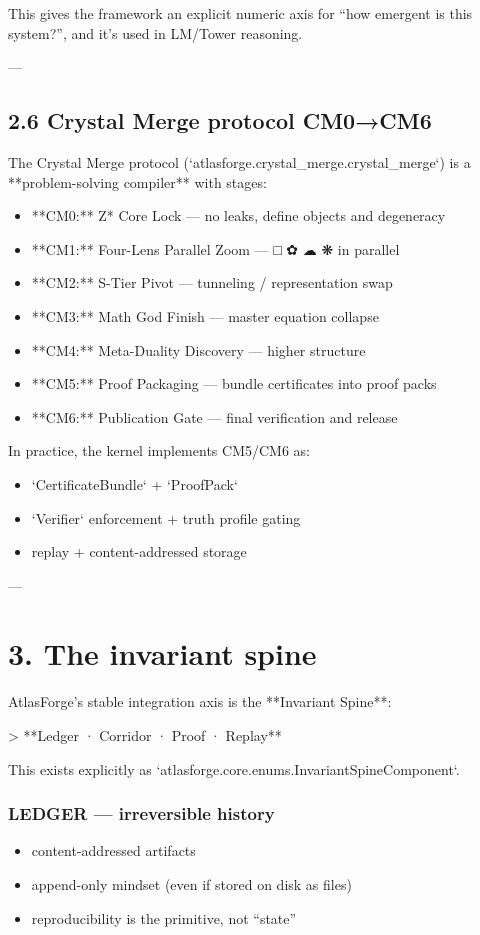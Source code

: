 \documentclass[11pt]{article}
\begin{document}
This gives the framework an explicit numeric axis for “how emergent is this system?”, and it’s used in LM/Tower reasoning.

---

\subsection{2.6 Crystal Merge protocol CM0→CM6}

The Crystal Merge protocol (`atlasforge.crystal\_merge.crystal\_merge`) is a **problem-solving compiler** with stages:

\begin{itemize}
\item **CM0:** Z* Core Lock — no leaks, define objects and degeneracy
\item **CM1:** Four-Lens Parallel Zoom — □ ✿ ☁ ❋ in parallel
\item **CM2:** S-Tier Pivot — tunneling / representation swap
\item **CM3:** Math God Finish — master equation collapse
\item **CM4:** Meta-Duality Discovery — higher structure
\item **CM5:** Proof Packaging — bundle certificates into proof packs
\item **CM6:** Publication Gate — final verification and release
\end{itemize}

In practice, the kernel implements CM5/CM6 as:
\begin{itemize}
\item `CertificateBundle` + `ProofPack`
\item `Verifier` enforcement + truth profile gating
\item replay + content-addressed storage
\end{itemize}

---

\section{3. The invariant spine}

AtlasForge’s stable integration axis is the **Invariant Spine**:

> **Ledger · Corridor · Proof · Replay**

This exists explicitly as `atlasforge.core.enums.InvariantSpineComponent`.

\subsubsection{LEDGER — irreversible history}
\begin{itemize}
\item content-addressed artifacts
\item append-only mindset (even if stored on disk as files)
\item reproducibility is the primitive, not “state”
\end{itemize}
\end{document}
